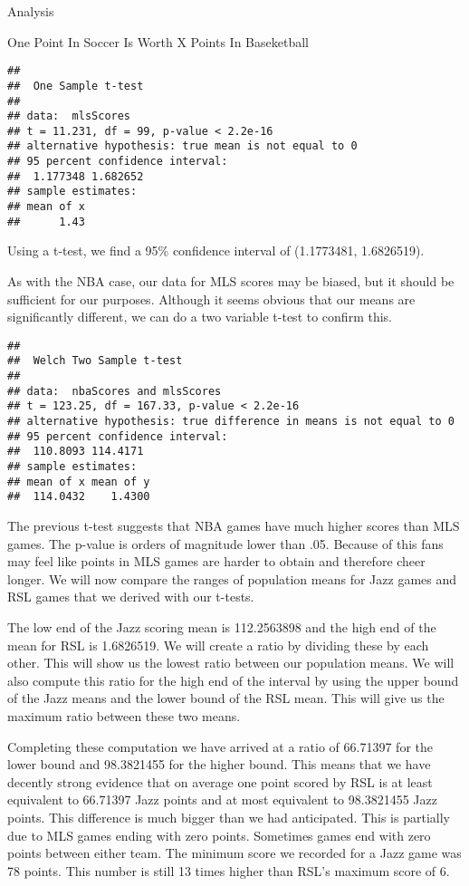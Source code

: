 \documentclass[
  ignorenonframetext,
]{beamer}
\begin{document}
\begin{frame}[fragile]{Analysis}
\begin{block}{One Point In Soccer Is Worth X Points In Baseketball}
\begin{verbatim}
## 
##  One Sample t-test
## 
## data:  mlsScores
## t = 11.231, df = 99, p-value < 2.2e-16
## alternative hypothesis: true mean is not equal to 0
## 95 percent confidence interval:
##  1.177348 1.682652
## sample estimates:
## mean of x 
##      1.43
\end{verbatim}

Using a t-test, we find a 95\% confidence interval of (1.1773481,
1.6826519).

As with the NBA case, our data for MLS scores may be biased, but it
should be sufficient for our purposes. Although it seems obvious that
our means are significantly different, we can do a two variable t-test
to confirm this.

\begin{verbatim}
## 
##  Welch Two Sample t-test
## 
## data:  nbaScores and mlsScores
## t = 123.25, df = 167.33, p-value < 2.2e-16
## alternative hypothesis: true difference in means is not equal to 0
## 95 percent confidence interval:
##  110.8093 114.4171
## sample estimates:
## mean of x mean of y 
##  114.0432    1.4300
\end{verbatim}

The previous t-test suggests that NBA games have much higher scores than
MLS games. The p-value is orders of magnitude lower than .05. Because of
this fans may feel like points in MLS games are harder to obtain and
therefore cheer longer. We will now compare the ranges of population
means for Jazz games and RSL games that we derived with our t-tests.

The low end of the Jazz scoring mean is 112.2563898 and the high end of
the mean for RSL is 1.6826519. We will create a ratio by dividing these
by each other. This will show us the lowest ratio between our population
means. We will also compute this ratio for the high end of the interval
by using the upper bound of the Jazz means and the lower bound of the
RSL mean. This will give us the maximum ratio between these two means.

Completing these computation we have arrived at a ratio of 66.71397 for
the lower bound and 98.3821455 for the higher bound. This means that we
have decently strong evidence that on average one point scored by RSL is
at least equivalent to 66.71397 Jazz points and at most equivalent to
98.3821455 Jazz points. This difference is much bigger than we had
anticipated. This is partially due to MLS games ending with zero points.
Sometimes games end with zero points between either team. The minimum
score we recorded for a Jazz game was 78 points. This number is still 13
times higher than RSL's maximum score of 6.
\end{block}


\end{frame}
\end{document}
